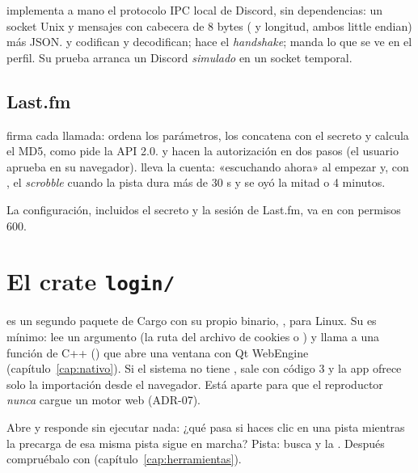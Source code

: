  implementa a mano el protocolo IPC local de Discord, sin dependencias: un
socket Unix y mensajes con cabecera de 8 bytes ( y longitud, ambos  little
endian) más JSON.  y  codifican y decodifican;  hace
el \emph{handshake};  manda lo que se ve en el perfil. Su prueba arranca un
Discord \emph{simulado} en un socket temporal.

\subsection{Last.fm}

 firma cada llamada:  ordena los parámetros, los concatena con el
secreto y calcula el MD5, como pide la API 2.0.  y  hacen la
autorización en dos pasos (el usuario aprueba en su navegador).  lleva la
cuenta: «escuchando ahora» al empezar y, con , el \emph{scrobble} cuando
la pista dura más de 30 s y se oyó la mitad o 4 minutos.

La configuración, incluidos el secreto y la sesión de Last.fm, va en  con
permisos 600.

\section{El crate \texttt{login/}}

 es un segundo paquete de Cargo con su propio binario,
, para Linux. Su  es mínimo: lee un argumento (la
ruta del archivo de cookies o ) y llama a una función de C++
() que abre una ventana con Qt WebEngine
(capítulo~\ref{cap:nativo}). Si el sistema no tiene ,  sale con
código 3 y la app ofrece solo la importación desde el navegador. Está aparte para que el
reproductor \emph{nunca} cargue un motor web (ADR-07).

\begin{ejercicio}
Abre  y responde sin ejecutar nada: ¿qué pasa si haces clic en una
pista mientras la precarga de esa misma pista sigue en marcha? Pista: busca 
y la . Después compruébalo con
 (capítulo~\ref{cap:herramientas}).
\end{ejercicio}
